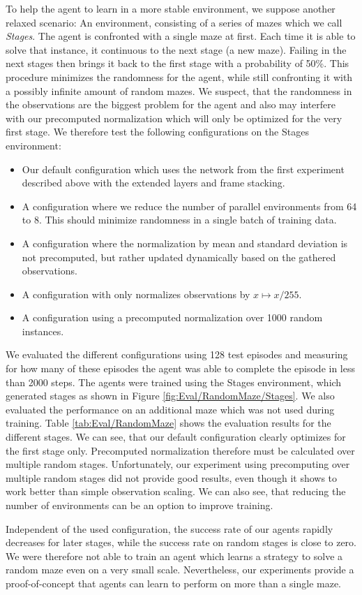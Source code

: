 To help the agent to learn in a more stable environment, we suppose another relaxed scenario: An environment, consisting of a series of mazes which we call \textit{Stages}. The agent is confronted with a single maze at first. Each time it is able to solve that instance, it continuous to the next stage (a new maze). Failing in the next stages then brings it back to the first stage with a probability of 50\%. This procedure minimizes the randomness for the agent, while still confronting it with a possibly infinite amount of random mazes. We suspect, that the randomness in the observations are the biggest problem for the agent and also may interfere with our precomputed normalization which will only be optimized for the very first stage. We therefore test the following configurations on the Stages environment:

\begin{itemize}
    \item Our default configuration which uses the network from the first experiment described above with the extended layers and frame stacking. 
    \item A configuration where we reduce the number of parallel environments from 64 to 8. This should minimize randomness in a single batch of training data.
    \item A configuration where the normalization by mean and standard deviation is not precomputed, but rather updated dynamically based on the gathered observations.
    \item A configuration with only normalizes observations by $x \mapsto x / 255$.
    \item A configuration using a precomputed normalization over 1000 random instances.
\end{itemize}

We evaluated the different configurations using 128 test episodes and measuring for how many of these episodes the agent was able to complete the episode in less than 2000 steps. The agents were trained using the Stages environment, which generated stages as shown in Figure \ref{fig:Eval/RandomMaze/Stages}. We also evaluated the performance on an additional maze which was not used during training. Table \ref{tab:Eval/RandomMaze} shows the evaluation results for the different stages. We can see, that our default configuration clearly optimizes for the first stage only. Precomputed normalization therefore must be calculated over multiple random stages. Unfortunately, our experiment using precomputing over multiple random stages did not provide good results, even though it shows to work better than simple observation scaling. We can also see, that reducing the number of environments can be an option to improve training. 

Independent of the used configuration, the success rate of our agents rapidly decreases for later stages, while the success rate on random stages is close to zero. We were therefore not able to train an agent which learns a strategy to solve a random maze even on a very small scale. Nevertheless, our experiments provide a proof-of-concept that agents can learn to perform on more than a single maze.